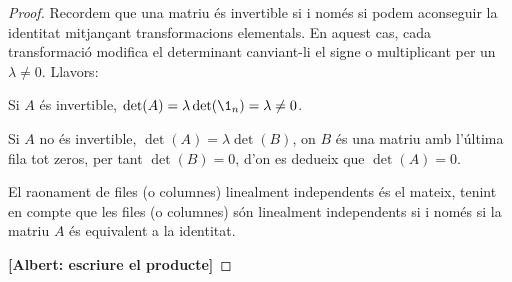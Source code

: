 \begin{proof}
	Recordem que una matriu és invertible si i només si podem aconseguir la identitat mitjançant transformacions elementals. En aquest cas, cada transformació modifica el determinant canviant-li el signe o multiplicant per un $\lambda\neq 0$. Llavors:
	
	Si $A$ és invertible, $\det(A)=\lambda \det(\1_n)=\lambda \neq 0$.
	
	Si $A$ no és invertible, $\det(A)=\lambda \det(B)$, on $B$ és una matriu amb l'última fila tot zeros, per tant $\det(B)=0$, d'on es dedueix que $\det(A)=0$.
	
	El raonament de files (o columnes) linealment independents és el mateix, tenint en compte que les files (o columnes) són linealment independents si i només si la matriu $A$ és equivalent a la identitat.
	
	\textbf{[Albert: escriure el producte]}  
\end{proof}